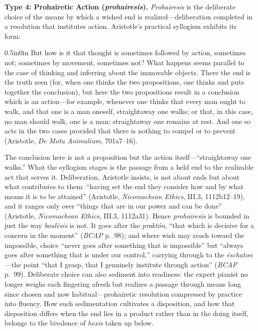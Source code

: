 \documentclass{article}
\begin{document}
\textbf{Type 4: Prohairetic Action (\textit{prohairesis}).} \textit{Prohairesis} is the deliberate choice of the means by which a wished end is realized---deliberation completed in a resolution that institutes action. Aristotle's practical syllogism exhibits its form:

\begin{adjustwidth}{0.5in}{0in}
But how is it that thought is sometimes followed by action, sometimes not; sometimes by movement, sometimes not? What happens seems parallel to the case of thinking and inferring about the immovable objects. There the end is the truth seen (for, when one thinks the two propositions, one thinks and puts together the conclusion), but here the two propositions result in a conclusion which is an action---for example, whenever one thinks that every man ought to walk, and that one is a man oneself, straightaway one walks; or that, in this case, no man should walk, one is a man: straightaway one remains at rest. And one so acts in the two cases provided that there is nothing to compel or to prevent (Aristotle, \textit{De Motu Animalium}, 701a7--16).
\end{adjustwidth}

The conclusion here is not a proposition but the action itself---``straightaway one walks.'' What the syllogism stages is the passage from a held end to the realizable act that serves it. Deliberation, Aristotle insists, is not about ends but about what contributes to them: ``having set the end they consider how and by what means it is to be attained'' (Aristotle, \textit{Nicomachean Ethics}, III.3, 1112b12--19), and it ranges only over ``things that are in our power and can be done'' (Aristotle, \textit{Nicomachean Ethics}, III.3, 1112a31). Hence \textit{prohairesis} is bounded in just the way \textit{boulēsis} is not. It goes after the \textit{praktón}, ``that which is decisive for a concern in the moment'' (\textit{BCAP} p.~98); and where wish may reach toward the impossible, choice ``never goes after something that is impossible'' but ``always goes after something that is under our control,'' carrying through to the \textit{éschaton}---the point ``that I grasp, that I genuinely institute through action'' (\textit{BCAP} p.~99). Deliberate choice can also sediment into readiness: the expert pianist no longer weighs each fingering afresh but realizes a passage through means long since chosen and now habitual---prohairetic resolution compressed by practice into fluency. How such sedimentation cultivates a disposition, and how that disposition differs when the end lies in a product rather than in the doing itself, belongs to the bivalence of \textit{hexis} taken up below.
\end{document}
